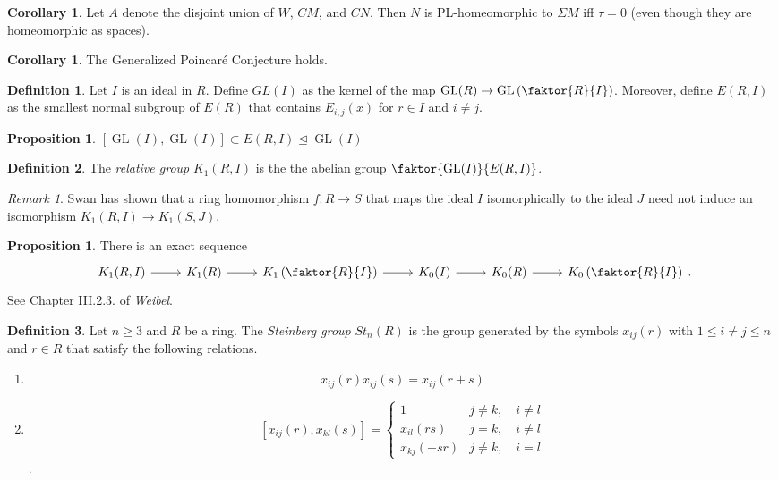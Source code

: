 \documentclass[10pt,letterpaper,cm]{nupset}
\theoremstyle{definition}
\newtheorem{definition}{Definition}
\theoremstyle{theorem}
\newtheorem{prop}[theorem]{Proposition}
\newtheorem{corollary}[theorem]{Corollary}
\theoremstyle{remark}
\newtheorem{remark}{Remark}
\newcommand{\1}{\mathbf{1}}
\newcommand{\0}{\vec 0}
\DeclareMathOperator*{\GL}{GL}
\begin{document}
\begin{corollary}
Let $A$ denote the disjoint union of $W$, $CM$, and $CN$. Then $N$ is PL-homeomorphic to $\Sigma M$ iff $\tau = 0$ (even though they are homeomorphic as spaces).
\end{corollary}

\begin{corollary}
The Generalized Poincar\'e Conjecture holds.
\end{corollary}

\begin{definition}
Let $I$ is an ideal in $R$. Define $GL(I)$ as the kernel of the map $\GL(R) \to \GL\left(\faktor{R}{I}\right)$. Moreover, define $E(R, I)$ as the smallest normal subgroup of $E(R)$ that contains $E_{i, j}(x)$ for $r\in I$ and $i\ne j$.
\end{definition}

\begin{prop}
$[\GL(I), \GL(I)] \subset E(R, I)\unlhd \GL(I)$
\end{prop}

\begin{definition}
The \textit{relative group} $K_1(R, I)$ is the the abelian group $\faktor{\GL(I)}{E(R, I)}$.
\end{definition}

\begin{remark}
Swan has shown that a ring homomorphism $f: R\to S$ that maps the ideal $I$ isomorphically to the ideal $J$ need not induce an isomorphism $K_1(R, I) \to K_1(S, J)$.
\end{remark}

\begin{prop}
There is an exact sequence 
\[
\begin{tikzcd}
{K_1(R, I)} \arrow[r] & K_1(R) \arrow[r] & K_1\left(\faktor{R}{I}\right) \arrow[r] & K_0(I) \arrow[r] & K_0(R) \arrow[r] & K_0\left(\faktor{R}{I}\right)
\end{tikzcd}.
\] See Chapter III.2.3. of \textit{Weibel}.
\end{prop}

\begin{definition}
Let $n\geq 3$ and $R$ be a ring. The \textit{Steinberg group} $St_n(R)$ is the group generated by the symbols $x_{ij}(r)$ with $1\leq i\ne j\leq n$ and $r\in R$ that satisfy the following relations.
\begin{enumerate}
\item $$x_{ij}(r)x_{ij}(s) = x_{ij}(r+s)$$
\item 
\[ [x_{ij}(r), x_{kl}(s)] = 
\begin{cases}
1 & j\ne k, \quad i\ne l \\
x_{il}(rs) & j= k, \quad i\ne l \\
x_{kj}(-sr) & j \ne k, \quad i=l
\end{cases} \].
\end{enumerate}
\end{definition}
\end{document}

